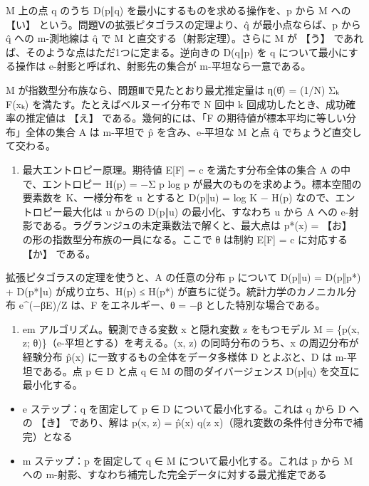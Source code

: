 \documentclass[
  10pt,
  a4paper,
]{article}
\providecommand{\tightlist}{%
  \setlength{\itemsep}{0pt}\setlength{\parskip}{0pt}}
\begin{document}
M 上の点 q のうち D(p‖q) を最小にするものを求める操作を、p から M への
【い】 という。問題Ⅴの拡張ピタゴラスの定理より、{\fallbackfont q̂}
が最小点ならば、p から {\fallbackfont q̂} への m-測地線は
{\fallbackfont q̂} で M と直交する（射影定理）。さらに M が 【う】
であれば、そのような点はただ1つに定まる。逆向きの D(q‖p) を q
について最小にする操作は e-射影と呼ばれ、射影先の集合が
m-平坦なら一意である。

M が指数型分布族なら、問題Ⅲで見たとおり最尤推定量は η({\fallbackfont θ̂})
= (1/N) Σ{\fallbackfont ₖ} F(x{\fallbackfont ₖ})
を満たす。たとえばベルヌーイ分布で N 回中 k
回成功したとき、成功確率の推定値は 【え】 である。幾何的には、「F
の期待値が標本平均に等しい分布」全体の集合 A は m-平坦で
{\fallbackfont p̂} を含み、e-平坦な M と点 {\fallbackfont q̂}
でちょうど直交して交わる。

\begin{enumerate}
\def\labelenumi{(\arabic{enumi})}
\setcounter{enumi}{1}
\tightlist
\item
  最大エントロピー原理。期待値 E{[}F{]} = c を満たす分布全体の集合 A
  の中で、エントロピー H(p) = −Σ p log p
  が最大のものを求めよう。標本空間の要素数を K、一様分布を u とすると
  D(p‖u) = log K − H(p) なので、エントロピー最大化は u からの D(p‖u)
  の最小化、すなわち u から A への
  e-射影である。ラグランジュの未定乗数法で解くと、最大点は p*(x) =
  【お】 の形の指数型分布族の一員になる。ここで θ は制約 E{[}F{]} = c
  に対応する 【か】 である。
\end{enumerate}

拡張ピタゴラスの定理を使うと、A の任意の分布 p について D(p‖u) = D(p‖p*)
+ D(p*‖u) が成り立ち、H(p) ≤ H(p*)
が直ちに従う。統計力学のカノニカル分布 e\^{}(−βE)/Z は、F
をエネルギー、θ = −β とした特別な場合である。

\begin{enumerate}
\def\labelenumi{(\arabic{enumi})}
\setcounter{enumi}{2}
\tightlist
\item
  em アルゴリズム。観測できる変数 x と隠れ変数 z をもつモデル M = \{p(x,
  z; θ)\}（e-平坦とする）を考える。(x, z) の同時分布のうち、x
  の周辺分布が経験分布 {\fallbackfont p̂}(x)
  に一致するもの全体をデータ多様体 D とよぶと、D は m-平坦である。点 p ∈
  D と点 q ∈ M の間のダイバージェンス D(p‖q) を交互に最小化する。
\end{enumerate}

\begin{itemize}
\tightlist
\item
  e ステップ：q を固定して p ∈ D について最小化する。これは q から D
  への 【き】 であり、解は p(x, z) = {\fallbackfont p̂}(x) q(z \textbar{}
  x)（隠れ変数の条件付き分布で補完）となる
\item
  m ステップ：p を固定して q ∈ M について最小化する。これは p から M
  への m-射影、すなわち補完した完全データに対する最尤推定である
\end{itemize}
\end{document}
